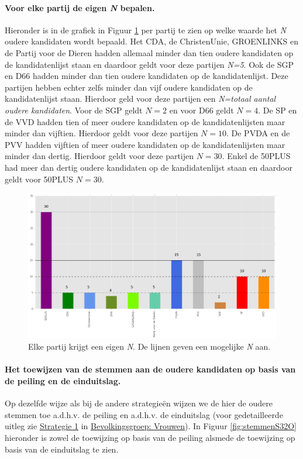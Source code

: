 \paragraph{Voor elke partij de eigen \textit{N} bepalen.}
Hieronder is in de grafiek in Figuur \ref{fig:XO} per partij te zien op welke waarde het \textit{N} oudere kandidaten wordt bepaald. Het CDA, de ChristenUnie, GROENLINKS en de Partij voor de Dieren hadden allemaal minder dan tien oudere kandidaten op de kandidatenlijst staan en daardoor geldt voor deze partijen \textit{N=5}. Ook de SGP en D66 hadden minder dan tien oudere kandidaten op de kandidatenlijst. Deze partijen hebben echter zelfs minder dan vijf oudere kandidaten op de kandidatenlijst staan. Hierdoor geld voor deze partijen een \textit{N=totaal aantal oudere kandidaten}. Voor de SGP geldt $N=2$ en voor D66 geldt $N=4$. De SP en de VVD hadden tien of meer oudere kandidaten op de kandidatenlijsten maar minder dan vijftien. Hierdoor geldt voor deze partijen $N=10$. De PVDA en de PVV hadden vijftien of meer oudere kandidaten op de kandidatenlijsten maar minder dan dertig. Hierdoor geldt voor deze partijen $N=30$. Enkel de 50PLUS had meer dan dertig oudere kandidaten op de kandidatenlijst staan en daardoor geldt voor 50PLUS $N=30$. 

\begin{figure}[H]

	\includegraphics[width=\linewidth]{eigenX_partijen_ouderen.png}
		\caption{Elke partij krijgt een eigen \textit{N}. De lijnen geven een mogelijke \textit{N} aan.}

\label{fig:XO}
\end{figure}





\paragraph{Het toewijzen van de stemmen aan de oudere kandidaten op basis van de peiling en de einduitslag.}
Op dezelfde wijze als bij de andere strategie\"{e}n wijzen we de hier de oudere stemmen toe a.d.h.v. de peiling en a.d.h.v. de einduitslag (voor gedetailleerde uitleg zie \hyperref[S1V]{Strategie 1} in \hyperref[vrouwen]{Bevolkingsgroep: Vrouwen}). In Figuur \ref{fig:stemmenS32O} hieronder is zowel de toewijzing op basis van de peiling alsmede de toewijzing op basis van de einduitslag te zien.


